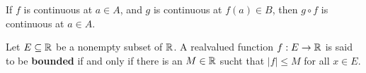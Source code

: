 \begin{corollary}
    If $f$ is continuous at $a \in A$, and $g$ is continuous at $f(a) \in B$, 
    then $g \circ f$ is continuous at $a \in A$.
\end{corollary}

\begin{definition}
    Let $E \subseteq \mathbb{R}$ be a nonempty subset of $\mathbb{R}$. A realvalued function $f:E \rightarrow \mathbb{R}$ 
    is said to be \textbf{bounded} if and only if there is an $M \in \mathbb{R}$ sucht that 
    $|f| \leq M$ for all  $x \in E$.
\end{definition}
